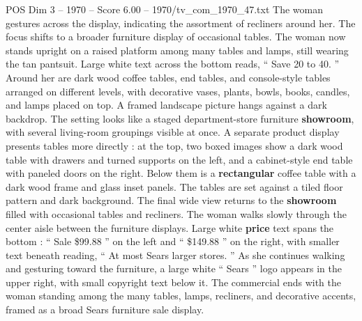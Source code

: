 \begin{textsample}{POS Dim 3 – 1970 – Score 6.00 – 1970/tv\_com\_1970\_47.txt}
The woman gestures across the display, indicating the assortment of recliners around her.
The focus shifts to a broader furniture display of occasional tables.
The woman now stands upright on a raised platform among many tables and lamps, still wearing the tan pantsuit.
Large white text across the bottom reads, “ Save 20 to 40. ” Around her are dark wood coffee tables, end tables, and console-style tables arranged on different levels, with decorative vases, plants, bowls, books, candles, and lamps placed on top.
A framed landscape picture hangs against a dark backdrop.
The setting looks like a staged department-store furniture \textbf{showroom}, with several living-room groupings visible at once.
A separate product display presents tables more directly : at the top, two boxed images show a dark wood table with drawers and turned supports on the left, and a cabinet-style end table with paneled doors on the right.
Below them is a \textbf{rectangular} coffee table with a dark wood frame and glass inset panels.
The tables are set against a tiled floor pattern and dark background.
The final wide view returns to the \textbf{showroom} filled with occasional tables and recliners.
The woman walks slowly through the center aisle between the furniture displays.
Large white \textbf{price} text spans the bottom : “ Sale \$99.88 ” on the left and “ \$149.88 ” on the right, with smaller text beneath reading, “ At most Sears larger stores. ” As she continues walking and gesturing toward the furniture, a large white “ Sears ” logo appears in the upper right, with small copyright text below it.
The commercial ends with the woman standing among the many tables, lamps, recliners, and decorative accents, framed as a broad Sears furniture sale display.

\end{textsample}
